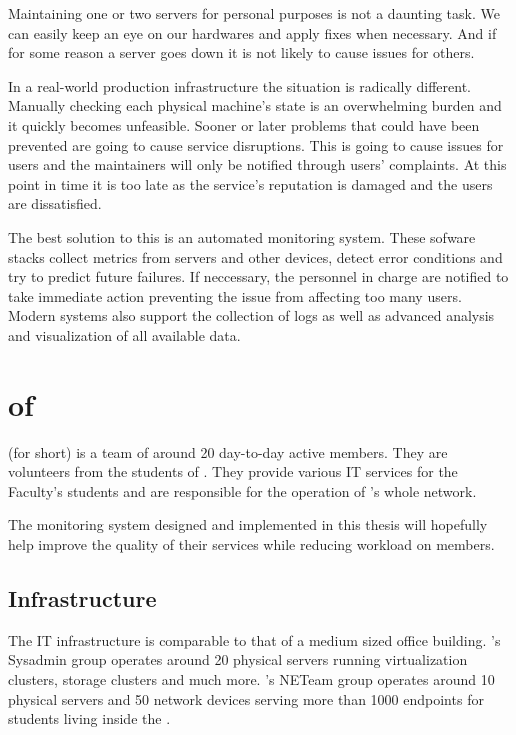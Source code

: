 Maintaining one or two servers for personal purposes is not a daunting task. We
can easily keep an eye on our hardwares and apply fixes when necessary. And if
for some reason a server goes down it is not likely to cause issues for others.

In a real-world production infrastructure the situation is radically different.
Manually checking each physical machine's state is an overwhelming burden and
it quickly becomes unfeasible. Sooner or later problems that could have been
prevented are going to cause service disruptions. This is going to cause issues
for users and the maintainers will only be notified through users' complaints.
At this point in time it is too late as the service's reputation is damaged and
the users are dissatisfied.

The best solution to this is an automated monitoring system. These sofware
stacks collect metrics from servers and other devices, detect error conditions
and try to predict future failures. If neccessary, the personnel in charge are
notified to take immediate action preventing the issue from affecting too many
users. Modern systems also support the collection of logs as well as advanced
analysis and visualization of all available data.

\section{\kszkfull of \schfull}

\kszkfull (\kszk for short) is a team of around 20 day-to-day active members.
They are volunteers from the students of \vik. They provide various IT
services for the Faculty's students and are responsible for the operation of
\schfull's whole network.

The monitoring system designed and implemented in this thesis will hopefully
help \kszk improve the quality of their services while reducing workload on
members.

\subsection{Infrastructure}

The IT infrastructure is comparable to that of a medium sized office building.
\kszk's Sysadmin group operates around 20 physical servers running
virtualization clusters, storage clusters and much more. \kszk's NETeam group
operates around 10 physical servers and 50 network devices serving more than
1000 endpoints for students living inside the \sch.


